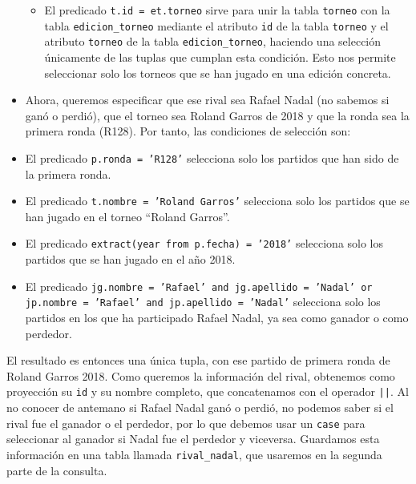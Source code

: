 \documentclass[11pt]{opticajnl}
\begin{document}
\begin{itemize}
\begin{itemize}
\item El predicado \texttt{t.id = et.torneo} sirve para unir la tabla \texttt{torneo} con la tabla \texttt{edicion\_torneo} mediante el atributo \texttt{id} de la tabla \texttt{torneo} y el atributo \texttt{torneo} de la tabla \texttt{edicion\_torneo}, haciendo una selección únicamente de las tuplas que cumplan esta condición. Esto nos permite seleccionar solo los torneos que se han jugado en una edición concreta.
\end{itemize}
\item Ahora, queremos especificar que ese rival sea Rafael Nadal (no sabemos si ganó o perdió), que el torneo sea Roland Garros de 2018 y que la ronda sea la primera ronda (R128). Por tanto, las condiciones de selección son:
\item El predicado \texttt{p.ronda = 'R128'} selecciona solo los partidos que han sido de la primera ronda.
\item El predicado \texttt{t.nombre = 'Roland Garros'} selecciona solo los partidos que se han jugado en el torneo ``Roland Garros''.
\item El predicado \texttt{extract(year from p.fecha) = '2018'} selecciona solo los partidos que se han jugado en el año 2018.
\item El predicado \texttt{jg.nombre = 'Rafael' and jg.apellido = 'Nadal' or jp.nombre = 'Rafael' and jp.apellido = 'Nadal'} selecciona solo los partidos en los que ha participado Rafael Nadal, ya sea como ganador o como perdedor.
\end{itemize}

El resultado es entonces una única tupla, con ese partido de primera ronda de Roland Garros 2018. Como queremos la información del rival, obtenemos como proyección su \texttt{id} y su nombre completo, que concatenamos con el operador \texttt{||}. Al no conocer de antemano si Rafael Nadal ganó o perdió, no podemos saber si el rival fue el ganador o el perdedor, por lo que debemos usar un \texttt{case} para seleccionar al ganador si Nadal fue el perdedor y viceversa. Guardamos esta información en una tabla llamada \texttt{rival\_nadal}, que usaremos en la segunda parte de la consulta. \\
\end{document}
